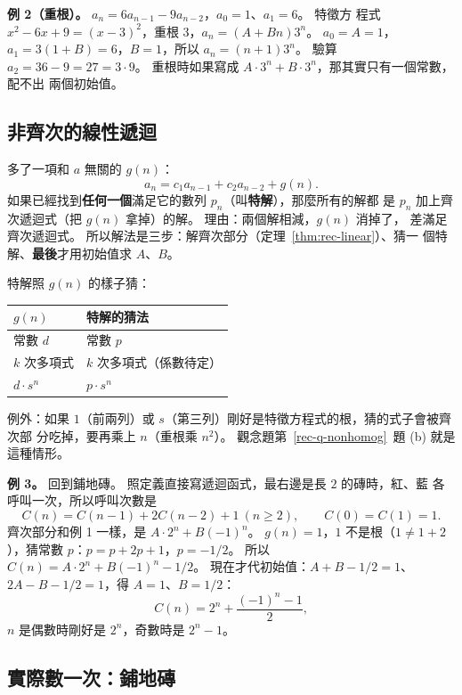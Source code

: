 \textbf{例 2（重根）。} $a_n = 6a_{n-1} - 9a_{n-2}$，$a_0 = 1$、$a_1 = 6$。 特徵方
程式 $x^2 - 6x + 9 = (x - 3)^2$，重根 $3$，$a_n = (A + Bn) 3^n$。 $a_0 = A = 1$，
$a_1 = 3(1 + B) = 6$，$B = 1$，所以 $a_n = (n + 1) 3^n$。 驗算 $a_2 = 36 - 9 = 27 =
3 \cdot 9$。 重根時如果寫成 $A \cdot 3^n + B \cdot 3^n$，那其實只有一個常數，配不出
兩個初始值。

\subsection{非齊次的線性遞迴}

多了一項和 $a$ 無關的 $g(n)$：
\[
a_n = c_1 a_{n-1} + c_2 a_{n-2} + g(n).
\]
如果已經找到\textbf{任何一個}滿足它的數列 $p_n$（叫\textbf{特解}），那麼所有的解都
是 $p_n$ 加上齊次遞迴式（把 $g(n)$ 拿掉）的解。 理由：兩個解相減，$g(n)$ 消掉了，
差滿足齊次遞迴式。 所以解法是三步：解齊次部分（定理~\ref{thm:rec-linear}）、猜一
個特解、\textbf{最後}才用初始值求 $A$、$B$。

特解照 $g(n)$ 的樣子猜：

\begin{center}
\begin{tabular}{ll}
\toprule
$g(n)$ & 特解的猜法 \\
\midrule
常數 $d$ & 常數 $p$ \\
$k$ 次多項式 & $k$ 次多項式（係數待定） \\
$d \cdot s^n$ & $p \cdot s^n$ \\
\bottomrule
\end{tabular}
\end{center}

例外：如果 $1$（前兩列）或 $s$（第三列）剛好是特徵方程式的根，猜的式子會被齊次部
分吃掉，要再乘上 $n$（重根乘 $n^2$）。 觀念題第~\ref{rec-q-nonhomog}~題 (b) 就是這種情形。

\textbf{例 3。} 回到鋪地磚。 照定義直接寫遞迴函式，最右邊是長 $2$ 的磚時，紅、藍
各呼叫一次，所以呼叫次數是
\[
C(n) = C(n-1) + 2C(n-2) + 1 \ (n \ge 2), \qquad C(0) = C(1) = 1 .
\]
齊次部分和例 1 一樣，是 $A \cdot 2^n + B(-1)^n$。 $g(n) = 1$，$1$ 不是根（$1 \ne 1
+ 2$），猜常數 $p$：$p = p + 2p + 1$，$p = -1/2$。 所以
$C(n) = A \cdot 2^n + B(-1)^n - 1/2$。 現在才代初始值：$A + B - 1/2 = 1$、
$2A - B - 1/2 = 1$，得 $A = 1$、$B = 1/2$：
\[
C(n) = 2^n + \frac{(-1)^n - 1}{2},
\]
$n$ 是偶數時剛好是 $2^n$，奇數時是 $2^n - 1$。

\subsection{實際數一次：鋪地磚}

